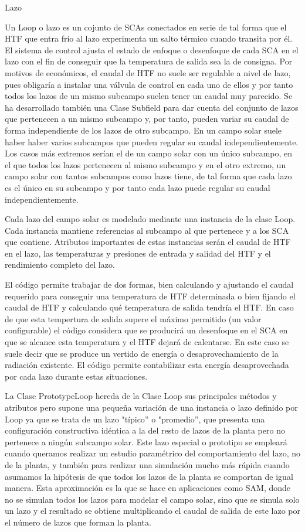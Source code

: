 \hypertarget{lazo}{Lazo}

Un Loop o lazo es un cojunto de SCAs conectados en serie de tal forma que el HTF que entra frío al lazo experimenta un salto térmico cuando transita por él. El sistema de control ajusta el estado de enfoque o desenfoque de cada SCA en el lazo con el fin de conseguir que la temperatura de salida sea la de consigna. Por motivos de económicos, el caudal de HTF no suele ser regulable a nivel de lazo, pues obligaría a instalar una válvula de control en cada uno de ellos y por tanto todos los lazos de un mismo subcampo suelen tener un caudal muy parecido. Se ha desarrollado también una Clase Subfield para dar cuenta del conjunto de lazos que pertenecen a un mismo subcampo y, por tanto, pueden variar su caudal de forma independiente de los lazos de otro subcampo. En un campo solar suele haber haber varios subcampos que pueden regular su caudal independientemente. Los casos más extremos serían el de un campo solar con un único subcampo, en el que todos los lazos pertenecen al mismo subcampo y en el otro extremo, un campo solar con tantos subcampos como lazos tiene, de tal forma que cada lazo es el único en su subcampo y por tanto cada lazo puede regular su caudal independientemente. 

Cada lazo del campo solar es modelado mediante una instancia de la clase Loop. Cada instancia mantiene referencias al subcampo al que pertenece y a los SCA que contiene. Atributos importantes de estas instancias serán el caudal de HTF en el lazo, las temperaturas y presiones de entrada y salidad del HTF y el rendimiento completo del lazo. 

El código permite trabajar de dos formas, bien calculando y ajustando el caudal requerido para conseguir una temperatura de HTF determinada o bien fijando el caudal de HTF y calculando qué temperatura de salida tendría el HTF. En caso de que esta tempertura de salida supere el máximo permitido (un valor configurable) el código considera que se producirá un desenfoque en el SCA en que se alcance esta temperatura y el HTF dejará de calentarse. En este caso se suele decir que se produce un vertido de energía o desaprovechamiento de la radiación existente. El código permite contabilizar esta energía desaprovechada por cada lazo durante estas situaciones. 

La Clase PrototypeLoop hereda de la Clase Loop sus principales métodos y atributos pero supone una pequeña variación de una instancia o lazo definido por Loop ya que se trata de un lazo  "típico'' o "promedio'', que presenta una configuración constructiva idéntica a la del resto de lazos de la planta pero no pertenece a ningún subcampo solar. Este lazo especial o prototipo se empleará cuando queramos realizar un estudio paramétrico del comportamiento del lazo, no de la planta, y también para realizar una simulación mucho más rápida cuando asumamos la hipótesis de que todos los lazos de la planta se comportan de igual manera. Esta aproximación es la que se hace en aplicaciones como SAM, donde no se simulan todos los lazos para modelar el campo solar, sino que se simula solo un lazo y el resultado se obtiene multiplicando el caudal de salida de este lazo por el número de lazos que forman la planta. 

